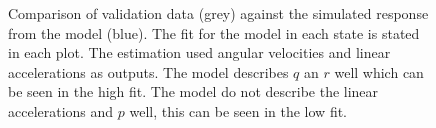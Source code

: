 \begin{figure}[tbp]
  \centering
  \qquad
  \qquad
    \qquad
    \qquad
    \qquad
  \caption{\label{fig:angVelComparelz6}%
    Comparison of validation data (grey) against the simulated response from the model (blue). The fit for the model in each state is stated in each plot. The estimation used angular velocities and linear accelerations as outputs. The model describes $q$ an $r$ well which can be seen in the high fit. The model do not describe the linear accelerations and $p$ well, this can be seen in the low fit.}
\end{figure}

